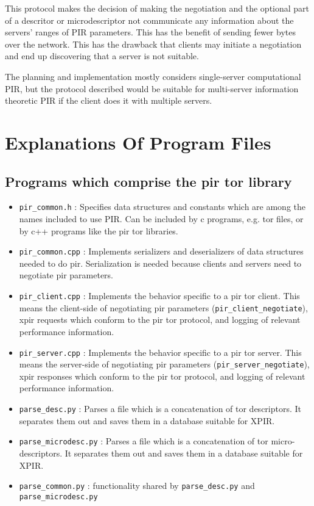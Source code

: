 \documentclass{article}
\begin{document}
    This protocol makes the decision of making the negotiation and the optional part of a descritor or microdescriptor not communicate any information about the servers' ranges of PIR parameters. This has the benefit of sending fewer bytes over the network. This has the drawback that clients may initiate a negotiation and end up discovering that a server is not suitable.

    The planning and implementation mostly considers single-server computational PIR, but the protocol described would be suitable for multi-server information theoretic PIR if the client does it with multiple servers.


\section{Explanations Of Program Files}
    \subsection{Programs which comprise the pir tor library}
     \begin{itemize}
        \item \texttt{pir\_common.h} : Specifies data structures and constants which are among the names included to use PIR. Can be included by c programs, e.g. tor files, or by c++ programs like the pir tor libraries.
        \item \texttt{pir\_common.cpp} : Implements serializers and deserializers of data structures needed to do pir. Serialization is needed because clients and servers need to negotiate pir parameters.
        \item \texttt{pir\_client.cpp} : Implements the behavior specific to a pir tor client. This means the client-side of negotiating pir parameters (\texttt{pir\_client\_negotiate}), xpir requests which conform to the pir tor protocol, and logging of relevant performance information.
        \item \texttt{pir\_server.cpp} : Implements the behavior specific to a pir tor server. This means the server-side of negotiating pir parameters (\texttt{pir\_server\_negotiate}), xpir responses which conform to the pir tor protocol, and logging of relevant performance information.
        \item \texttt{parse\_desc.py} : Parses a file which is a concatenation of tor descriptors. It separates them out and saves them in a database suitable for XPIR.
        \item \texttt{parse\_microdesc.py} : Parses a file which is a concatenation of tor micro-descriptors. It separates them out and saves them in a database suitable for XPIR.
        \item \texttt{parse\_common.py} : functionality shared by \texttt{parse\_desc.py} and \texttt{parse\_microdesc.py}
    \end{itemize}
\end{document}
